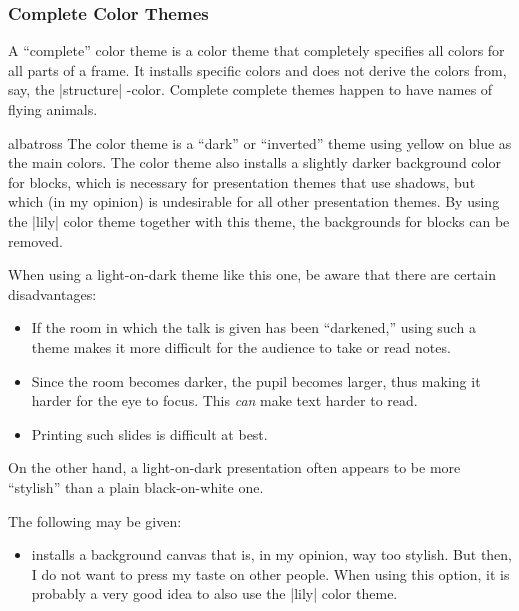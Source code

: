 \subsubsection{Complete Color Themes}

A ``complete'' color theme is a color theme that completely specifies
all colors for all parts of a frame. It installs specific colors and
does not derive the colors from, say, the |structure| \beamer-color.
Complete complete themes happen to have names of flying animals.

\begin{colorthemeexample}{albatross}
  The color theme is a ``dark'' or ``inverted'' theme using yellow on
  blue as the main colors. The color theme also installs a slightly
  darker background color for blocks, which is necessary for
  presentation themes that use shadows, but which (in my opinion) is
  undesirable for all other presentation themes. By using the |lily|
  color theme together with this theme, the backgrounds for blocks can
  be removed.

  When using a light-on-dark theme like this one, be aware that there
  are certain disadvantages:
  \begin{itemize}
  \item
    If the room in which the talk is given has been ``darkened,''
    using such a theme makes it more difficult for the audience to
    take or read notes.
  \item
    Since the room becomes darker, the pupil becomes larger, thus
    making it harder for the eye to focus. This \emph{can} make text
    harder to  read.
  \item
    Printing such slides is difficult at best.
  \end{itemize}

  On the other hand, a light-on-dark presentation often appears to be
  more ``stylish''  than a plain black-on-white one.

  The following  may be given:
  \begin{itemize}
    \item {} installs a background canvas that
      is, in my opinion, way too stylish. But then, I do not want
      to press my taste on other people. When using this option, it is
      probably a very good idea to also use the |lily| color theme.      
  \end{itemize}
\end{colorthemeexample}


